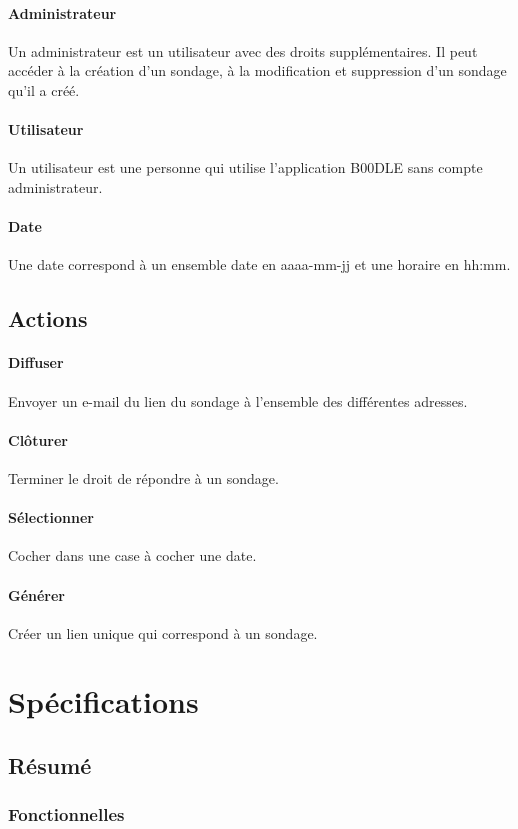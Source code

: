 \documentclass[titlepage]{report}
\begin{document}
\paragraph{Administrateur} Un administrateur est un utilisateur avec des droits supplémentaires. Il peut accéder à la création d’un sondage, à la modification et suppression d’un sondage qu’il a créé.
\paragraph{Utilisateur} Un utilisateur est une personne qui utilise l’application B00DLE sans compte administrateur.
\paragraph{Date} Une date correspond à un ensemble date en aaaa-mm-jj et une horaire en hh:mm.

\subsection{Actions}
\paragraph{Diffuser} Envoyer un e-mail du lien du sondage à l’ensemble des différentes adresses.
\paragraph{Clôturer} Terminer le droit de répondre à un sondage.
\paragraph{Sélectionner} Cocher dans une case à cocher une date.
\paragraph{Générer} Créer un lien unique qui correspond à un sondage.

\section{Spécifications}

\subsection{Résumé}
\subsubsection{Fonctionnelles}
\end{document}

